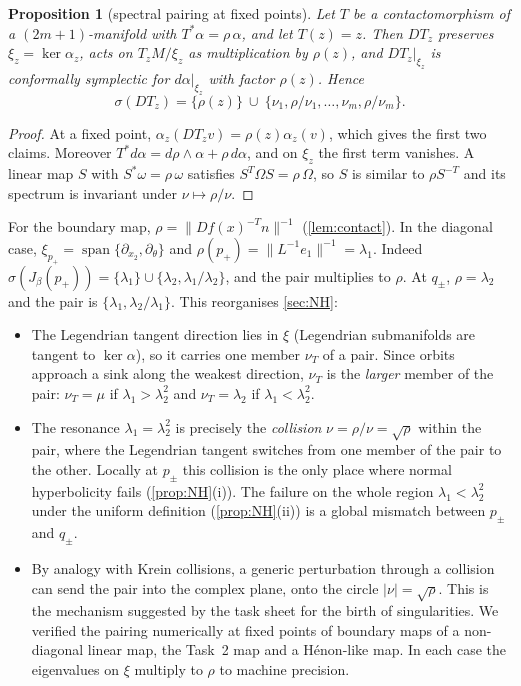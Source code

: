 \documentclass[11pt,a4paper]{article}
\newtheorem{proposition}[theorem]{Proposition}
\theoremstyle{definition}
\theoremstyle{remark}
\DeclareMathOperator{\spn}{span}
\begin{document}
\begin{proposition}[spectral pairing at fixed points]\label{prop:pairing}
Let $T$ be a contactomorphism of a $(2m+1)$-manifold with $T^*\alpha=\rho\,\alpha$, and let $T(z)=z$. Then $DT_z$
preserves $\xi_z=\ker\alpha_z$, acts on $T_zM/\xi_z$ as multiplication by $\rho(z)$, and $DT_z|_{\xi_z}$ is conformally
symplectic for $d\alpha|_{\xi_z}$ with factor $\rho(z)$. Hence
\[
  \sigma(DT_z)=\{\rho(z)\}\ \cup\ \{\nu_1,\rho/\nu_1,\dots,\nu_m,\rho/\nu_m\}.
\]
\end{proposition}
\begin{proof}
At a fixed point, $\alpha_z(DT_zv)=\rho(z)\alpha_z(v)$, which gives the first two claims. Moreover
$T^*d\alpha=d\rho\wedge\alpha+\rho\,d\alpha$, and on $\xi_z$ the first term vanishes. A linear map $S$ with
$S^*\omega=\rho\,\omega$ satisfies $S^T\Omega S=\rho\,\Omega$, so $S$ is similar to $\rho S^{-T}$ and its spectrum is invariant under
$\nu\mapsto\rho/\nu$.
\end{proof}

For the boundary map, $\rho=\|Df(x)^{-T}n\|^{-1}$ (\cref{lem:contact}). In the diagonal case, $\xi_{p_+}=\spn\{\partial_{x_2},\partial_\theta\}$
and $\rho(p_+)=\|L^{-1}e_1\|^{-1}=\lambda_1$. Indeed $\sigma(J_\beta(p_+))=\{\lambda_1\}\cup\{\lambda_2,\lambda_1/\lambda_2\}$, and
the pair multiplies to $\rho$. At $q_\pm$, $\rho=\lambda_2$ and the pair is $\{\lambda_1,\lambda_2/\lambda_1\}$. This
reorganises \cref{sec:NH}:
\begin{itemize}
  \item The Legendrian tangent direction lies in $\xi$ (Legendrian submanifolds are tangent to $\ker\alpha$), so it carries
  one member $\nu_T$ of a pair. Since orbits approach a sink along the weakest direction, $\nu_T$ is the \emph{larger}
  member of the pair: $\nu_T=\mu$ if $\lambda_1>\lambda_2^2$ and $\nu_T=\lambda_2$ if $\lambda_1<\lambda_2^2$.
  \item The resonance $\lambda_1=\lambda_2^2$ is precisely the \emph{collision} $\nu=\rho/\nu=\sqrt\rho$ within the pair, where
  the Legendrian tangent switches from one member of the pair to the other. Locally at $p_\pm$ this collision is the only
  place where normal hyperbolicity fails (\cref{prop:NH}(i)). The failure on the whole region $\lambda_1<\lambda_2^2$ under
  the uniform definition (\cref{prop:NH}(ii)) is a global mismatch between $p_\pm$ and $q_\pm$.
  \item By analogy with Krein collisions, a generic perturbation through a collision can send the pair into the complex
  plane, onto the circle $|\nu|=\sqrt{\rho}$. This is the mechanism suggested by the task sheet for the birth of
  singularities. We verified the pairing numerically at fixed points of boundary maps of a non-diagonal linear map,
  the Task~2 map and a H\'enon-like map. In each case the eigenvalues on $\xi$ multiply to $\rho$ to machine precision.
\end{itemize}
\end{document}
